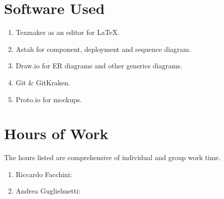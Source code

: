 \section{Software Used}
\begin{enumerate}
\item Texmaker as an editor for \LaTeX.
\item Astah for component, deployment and sequence diagram.
\item Draw.io for ER diagrams and other generics diagrams.
\item Git \& GitKraken.
\item Proto.io for mockups.
\end{enumerate}
\section{Hours of Work}
The hours listed are comprehensive of individual and group work time.
\begin{enumerate}
\item Riccardo Facchini:
\item Andrea Guglielmetti:
\end{enumerate}